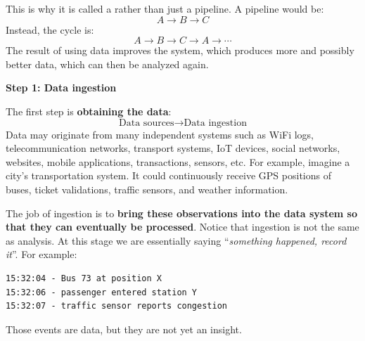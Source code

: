\noindent
This is why it is called a  rather than just a pipeline. A pipeline would be:
\begin{equation*}
    A\rightarrow B\rightarrow C
\end{equation*}
Instead, the cycle is:
\begin{equation*}
    A\rightarrow B\rightarrow C\rightarrow A\rightarrow\cdots
\end{equation*}
The result of using data improves the system, which produces more and possibly better data, which can then be analyzed again.

\highspace
\begin{flushleft}
    \textcolor{Green3}{ \textbf{Step 1: Data ingestion}}
\end{flushleft}
The first step is \textbf{obtaining the data}:
\begin{equation*}
    \text{Data sources} \rightarrow \text{Data ingestion}
\end{equation*}
Data may originate from many independent systems such as WiFi logs, telecommunication networks, transport systems, IoT devices, social networks, websites, mobile applications, transactions, sensors, etc. For example, imagine a city's transportation system. It could continuously receive GPS positions of buses, ticket validations, traffic sensors, and weather information.

\highspace
The job of ingestion is to \textbf{bring these observations into the data system so that they can eventually be processed}. Notice that ingestion is not the same as analysis. At this stage we are essentially saying ``\emph{something happened, record it}''. For example:
\begin{lstlisting}
15:32:04 - Bus 73 at position X
15:32:06 - passenger entered station Y
15:32:07 - traffic sensor reports congestion
\end{lstlisting}
Those events are data, but they are not yet an insight.

